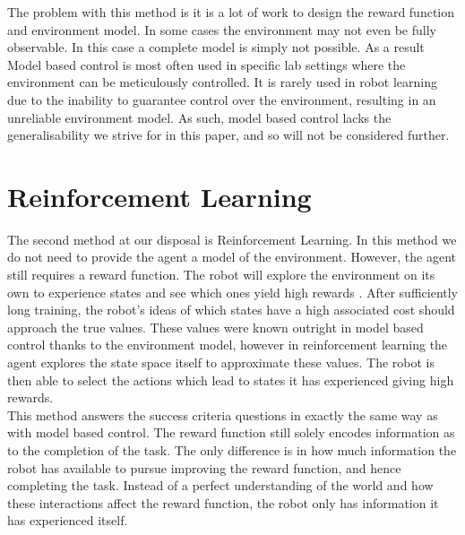 The problem with this method is it is a lot of work to design the reward function and environment model. In some cases the environment may not even be fully observable. In this case a complete model is simply not possible. As a result Model based control is most often used in specific lab settings where the environment can be meticulously controlled. It is rarely used in  robot learning due to the inability to guarantee control over the environment, resulting in an unreliable environment model. As such, model based control lacks the generalisability we strive for in this paper, and so will not be considered further.

\section{Reinforcement Learning}
\label{sec:reinforcement-learning}
The second method at our disposal is Reinforcement Learning. In this method we do not need to provide the agent a model of the environment. However, the agent still requires a reward function. The robot will explore the environment on its own to experience states and see which ones yield high rewards \cite{reinforcement-learning}. After sufficiently long training, the robot's ideas of which states have a high associated cost should approach the true values. These values were known outright in model based control thanks to the environment model, however in reinforcement learning the agent explores the state space itself to approximate these values. The robot is then able to select the actions which lead to states it has experienced giving high rewards.\\

This method answers the success criteria questions in exactly the same way as with model based control. The reward function still solely encodes information as to the completion of the task. The only difference is in how much information the robot has available to pursue improving the reward function, and hence completing the task. Instead of a perfect understanding of the world and how these interactions affect the reward function, the robot only has information it has experienced itself.\\

